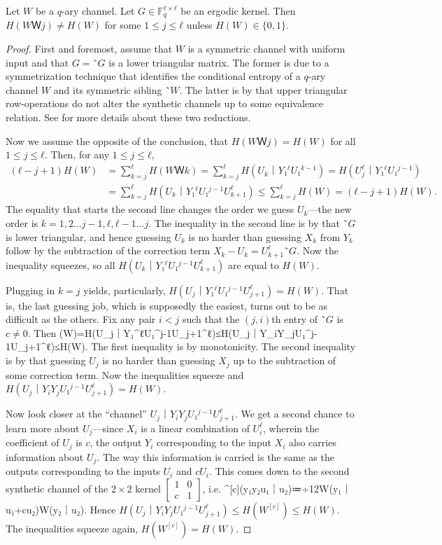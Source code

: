 \documentclass[openany]{amsbook}
\numberwithin{equation}{chapter}
\numberwithin{figure}{chapter}
\numberwithin{table}{chapter}
\def\locl{\bsm{1&0\\c&1}}
\def\bsm#1{[\begin{smallmatrix}#1\end{smallmatrix}]}
\def\[#1\]{\begin{equation*}{#1}\end{equation*}}
\theoremstyle{definition}	理dfn:Definition~?s			理exa:Example~?s
\theoremstyle{remark}		理cla:Claim~?s				理rem:Remark~?s
\begin{document}
	\begin{lem}\label{lem:moving}
		Let $W$ be a $q$-ary channel.
		Let $G∈𝔽_q^{ℓ×ℓ}$ be an ergodic kernel.
		Then $H(WＷj)≠H(W)$ for some $1≤j≤ℓ$ unless $H(W)∈\{0,1\}$.
	\end{lem}
	
	\begin{proof}
		First and foremost, assume that $W$ is a symmetric channel with uniform input
		and that $G=˜G$ is a lower triangular matrix.
		The former is due to a symmetrization technique that identifies
		the conditional entropy of a $q$-ary channel $W$ and its symmetric sibling $˜W$.
		The latter is by that upper triangular row-operations do not alter
		the synthetic channels up to some equivalence relation.
		See \cite{MT14} for more details about these two reductions.
		
		Now we assume the opposite of the conclusion,
		that $H(WＷj)=H(W)$ for all $1≤j≤ℓ$.
		Then, for any $1≤j≤ℓ$,
		\begin{align*}
			(ℓ-j+1)H(W)
			&	=∑_{k=j}^ℓH(WＷk)=∑_{k=j}^ℓH(U_k｜Y₁^ℓU₁^{k-1})
				=H(U_j^ℓ｜Y₁^ℓU₁^{j-1})	\\
			&	=∑_{k=j}^ℓH(U_k｜Y₁^ℓU₁^{j-1}U_{k+1}^ℓ)≤∑_{k=j}^ℓH(W)=(ℓ-j+1)H(W).
		\end{align*}
		The equality that starts the second line
		changes the order we guess $U_k$---the new order is $k=1,2…j-1,ℓ,ℓ-1…j$.
		The inequality in the second line is by that $˜G$ is lower triangular,
		and hence guessing $U_k$ is no harder than guessing $X_k$ from $Y_k$
		follow by the subtraction of the correction term $X_k-U_k=U_{k+1}^ℓ˜G$.
		Now the inequality squeezes, so all
		$H(U_k｜Y₁^ℓU₁^{j-1}U_{k+1}^ℓ)$ are equal to $H(W)$.
		
		Plugging in $k=j$ yields, particularly, $H(U_j｜Y₁^ℓU₁^{j-1}U_{j+1}^ℓ)=H(W)$.
		That is, the last guessing job, which is supposedly the easiest,
		turns out to be as difficult as the others.
		Fix any pair $i<j$ such that the $(j,i)$th entry of $˜G$ is $c≠0$.
		Then
		\[H(W)=H(U_j｜Y₁^ℓU₁^{j-1}U_{j+1}^ℓ)≤H(U_j｜Y_iY_jU₁^{j-1}U_{j+1}^ℓ)≤H(W).\]
		The first inequality is by monotonicity.
		The second inequality is by that guessing $U_j$ is no harder than
		guessing $X_j$ up to the subtraction of some correction term.
		Now the inequalities squeeze and $H(U_j｜Y_iY_jU₁^{j-1}U_{j+1}^ℓ)=H(W)$.
		
		Now look closer at the “channel” $U_j｜Y_iY_jU₁^{j-1}U_{j+1}^ℓ$.
		We get a second chance to learn more about $U_j$---since $X_i$ is a linear
		combination of $U_i^ℓ$, wherein the coefficient of $U_j$ is $c$, the output
		$Y_i$ corresponding to the input $X_i$ also carries information about $U_j$.
		The way this information is carried is the same as
		the outputs corresponding to the inputs $U_i$ and $cU_i$.
		This comes down to the second synthetic channel
		of the $2×2$ kernel $\locl$, i.e.
		\[W^{[c]}(y₁y₂u₁｜u₂)≔÷12W(y₁｜u₁+cu₂)W(y₂｜u₂).\]
		Hence $H(U_j｜Y_iY_jU₁^{j-1}U_{j+1}^ℓ)≤H(W^{[c]})≤H(W)$.
		The inequalities squeeze again, $H(W^{[c]})=H(W)$.
		

\end{proof}
\end{document}
